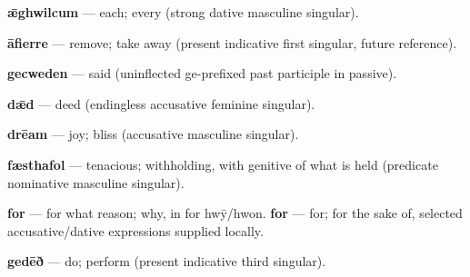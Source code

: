 \textbf{ǣghwilcum} — each; every (strong dative masculine singular).

\textbf{āfierre} — remove; take away (present indicative first singular, future reference).

\textbf{gecweden} — said (uninflected ge-prefixed past participle in passive).

\textbf{dǣd} — deed (endingless accusative feminine singular).

\textbf{drēam} — joy; bliss (accusative masculine singular).

\textbf{fæsthafol} — tenacious; withholding, with genitive of what is held (predicate nominative masculine singular).

\textbf{for} — for what reason; why, in for hwȳ/\allowbreak{}hwon. \textbf{for} — for; for the sake of, selected accusative/\allowbreak{}dative expressions supplied locally.

\textbf{gedēð} — do; perform (present indicative third singular).

